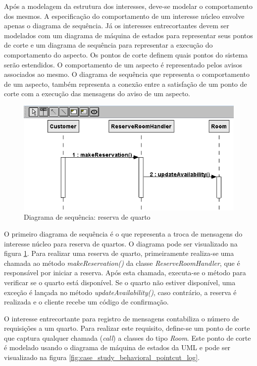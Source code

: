 Após a modelagem da estrutura dos interesses, deve-se modelar o comportamento dos mesmos. A especificação do comportamento de um interesse núcleo
envolve apenas o diagrama de sequência. Já os interesses entrecortantes devem ser modelados com um diagrama de máquina de estados para representar
seus pontos de corte e um diagrama de sequência para representar a execução do comportamento do aspecto. Os pontos de corte definem quais pontos do
sistema serão estendidos. O comportamento de um aspecto é representado pelos avisos associados ao mesmo. O diagrama de sequência que representa o
comportamento de um aspecto, também representa a conexão entre a satisfação de um ponto de corte com a execução das mensagens do aviso de um aspecto.

  \begin{figure}[!h]
	\centering
	\includegraphics{img/case_study_behavioral_reserve_room.png}
	\caption{Diagrama de sequência: reserva de quarto}\label{fig:case_study_behavioral_reserve_room}
  \end{figure}

O primeiro diagrama de sequência é o que representa a troca de mensagens do interesse núcleo para reserva de quartos. O diagrama pode ser visualizado
na figura \ref{fig:case_study_behavioral_reserve_room}. Para realizar uma reserva de quarto, primeiramente realiza-se uma chamada ao método
\textit{makeReservation()} da classe \textit{ReserveRoomHandler}, que é responsável por iniciar a reserva. Após esta chamada, executa-se o método
para verificar se o quarto está disponível. Se o quarto não estiver disponível, uma exceção é lançada no método \textit{updateAvailability()}, caso
contrário, a reserva é realizada e o cliente recebe um código de confirmação. 

O interesse entrecortante para registro de mensagens contabiliza o número de requisições a um quarto. Para realizar este requisito, define-se um ponto
de corte que captura qualquer chamada (\textit{call}) a classes do tipo \textit{Room}. Este ponto de corte é modelado usando o diagrama de máquina de
estados da UML e pode ser visualizado na figura \ref{fig:case_study_behavioral_pointcut_log}.

